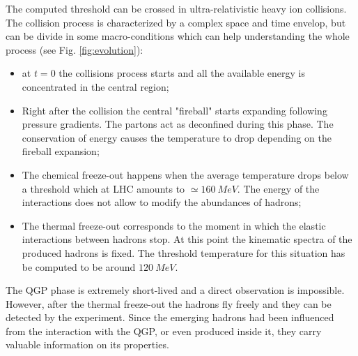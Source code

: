 The computed threshold can be crossed in ultra-relativistic heavy ion collisions.
The collision process is characterized by a complex space and time envelop, but can be divide in some macro-conditions which can help understanding the whole process (see Fig. \ref{fig:evolution}):
\begin{itemize}
    \item at $t=0$ the collisions process starts and all the available energy is concentrated in the central region;
    \item Right after the collision the central "fireball" starts expanding following pressure gradients. The partons act as deconfined during this phase. The conservation of energy causes the temperature to drop depending on the fireball expansion;
    \item The chemical freeze-out happens when the average temperature drops below a threshold which at LHC amounts to $\simeq160\ MeV$. The energy of the interactions does not allow to modify the abundances of hadrons;
    \item The thermal freeze-out corresponds to the moment in which the elastic interactions between hadrons stop. At this point the kinematic spectra of the produced hadrons is fixed. The threshold temperature for this situation has be computed to be around $120\ MeV$.
\end{itemize}

The QGP phase is extremely short-lived and a direct observation is impossible.
However, after the thermal freeze-out the hadrons fly freely and they can be detected by the experiment.
Since the emerging hadrons had been influenced from the interaction with the QGP, or even produced inside it, they carry valuable information on its properties.

